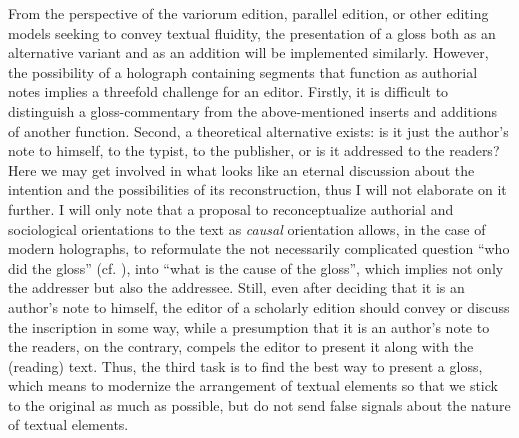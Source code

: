 \documentclass{article}
\begin{document}
From the perspective of the variorum edition, parallel edition,
or other editing models seeking to convey textual fluidity, the
presentation of a gloss both as an alternative variant and as an
addition will be implemented similarly. However, the possibility of a
holograph containing segments that function as authorial notes implies a
threefold challenge for an editor. Firstly, it is difficult to
distinguish a gloss-commentary from the above-mentioned inserts and
additions of another function. Second, a theoretical alternative exists:
is it just the author's note to himself, to the typist, to the
publisher, or is it addressed to the readers? Here we may get involved
in what looks like an eternal discussion about the intention and the
possibilities of its reconstruction, thus I will not elaborate on it
further. I will only note that a proposal to reconceptualize authorial
and sociological orientations to the text as \emph{causal} orientation
allows, in the case of modern holographs, to reformulate the not
necessarily complicated question ``who did the gloss'' (cf. \citealp[31]{shillingsburg_orientations_2015}), into ``what is the cause of the gloss'',
which implies not only the addresser but also the addressee. Still,
even after deciding that it is an author's note to himself, the editor
of a scholarly edition should convey or discuss the inscription in some
way, while a presumption that it is an author's note to the readers, on
the contrary, compels the editor to present it along with the (reading)
text. Thus, the third task is to find the best way to present a gloss,
which means to modernize the arrangement of textual elements so that we
stick to the original as much as possible, but do not send false signals
about the nature of textual elements.
\end{document}
